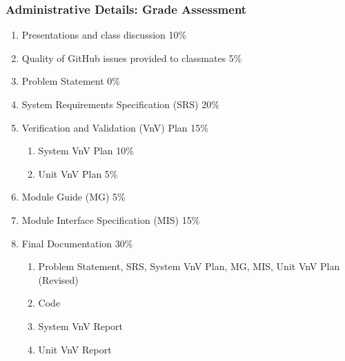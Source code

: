 \documentclass[t,12pt,numbers,fleqn]{beamer}
\begin{document}
\begin{frame}
\frametitle{Administrative Details: Grade Assessment}

\begin {enumerate}

\item Presentations and class discussion 10\%

\item Quality of GitHub issues provided to classmates 5\%

\item Problem Statement 0\%

\item System Requirements Specification (SRS) 20\%

\item Verification and Validation (VnV) Plan 15\%
\begin{enumerate}
\item System VnV Plan 10\%
\item Unit VnV Plan 5\%
\end{enumerate}

\item Module Guide (MG) 5\%

\item Module Interface Specification (MIS) 15\%

\item Final Documentation 30\%
\begin{enumerate}
\item Problem Statement, SRS, System VnV Plan, MG, MIS, Unit VnV Plan (Revised)
\item Code
\item System VnV Report
\item Unit VnV Report
\end{enumerate}

\end {enumerate}

\end{frame}

\end{document}
